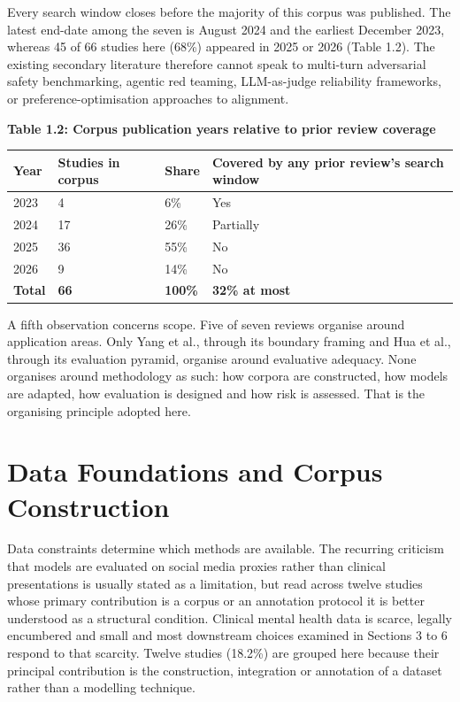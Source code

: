 \documentclass[11pt]{article}
\begin{document}
	Every search window closes before the majority of this corpus was published. The latest end-date among the seven is August 2024 and the earliest December 2023, whereas 45 of 66 studies here (68\%) appeared in 2025 or 2026 (Table 1.2). The existing secondary literature therefore cannot speak to multi-turn adversarial safety benchmarking, agentic red teaming, LLM-as-judge reliability frameworks, or preference-optimisation approaches to alignment.
	
	\begin{center}
		\textbf{Table 1.2: Corpus publication years relative to prior review coverage}
		\vspace{2pt}
		
		\footnotesize
		\setlength{\tabcolsep}{3pt}\renewcommand{\arraystretch}{1.1}
		\begin{tabularx}{\textwidth}{|X|X|X|X|}
			\hline
			\textbf{Year} & \textbf{Studies in corpus} & \textbf{Share} & \textbf{Covered by any prior review's search window} \\
			\hline
			2023 & 4 & 6\% & Yes \\
			\hline
			2024 & 17 & 26\% & Partially \\
			\hline
			2025 & 36 & 55\% & No \\
			\hline
			2026 & 9 & 14\% & No \\
			\hline
			\textbf{Total} & \textbf{66} & \textbf{100\%} & \textbf{32\% at most} \\
			\hline
		\end{tabularx}
	\end{center}
	
	A fifth observation concerns scope. Five of seven reviews organise around application areas. Only Yang et al., through its boundary framing and Hua et al.\cite{Hua2025}, through its evaluation pyramid, organise around evaluative adequacy. None organises around methodology as such: how corpora are constructed, how models are adapted, how evaluation is designed and how risk is assessed. That is the organising principle adopted here.
	
	\section{Data Foundations and Corpus Construction}
	
	Data constraints determine which methods are available. The recurring criticism that models are evaluated on social media proxies rather than clinical presentations is usually stated as a limitation, but read across twelve studies whose primary contribution is a corpus or an annotation protocol it is better understood as a structural condition. Clinical mental health data is scarce, legally encumbered and small and most downstream choices examined in Sections 3 to 6 respond to that scarcity. Twelve studies (18.2\%) are grouped here because their principal contribution is the construction, integration or annotation of a dataset rather than a modelling technique.
	
\end{document}
